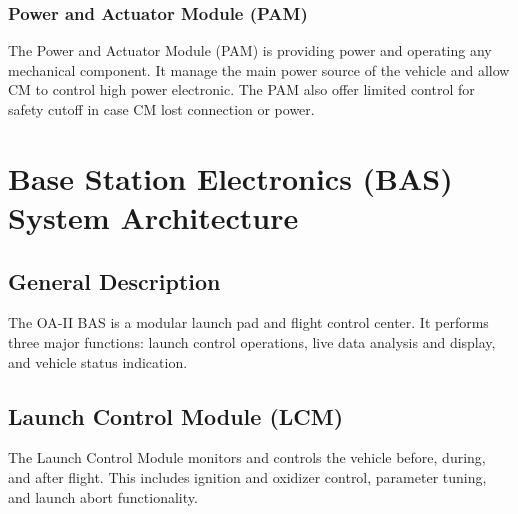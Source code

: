 \documentclass[12pt,article]{memoir}
\begin{document}
\subsection{Power and Actuator Module (PAM)}%
The Power and Actuator Module (PAM) is providing power and operating any mechanical component. It manage the main power source of the vehicle and allow CM to control high power electronic. The PAM also offer limited control for safety cutoff in case CM lost connection or power.

\newpage

\chapter{Base Station Electronics (BAS) System Architecture}
\section{General Description}
The OA-II BAS is a modular launch pad and flight control center. It performs three major functions: launch control operations, live data analysis and display, and vehicle status indication.
\section{Launch Control Module (LCM)}
The Launch Control Module monitors and controls the vehicle before, during, and after flight. This includes ignition and oxidizer control, parameter tuning, and launch abort functionality.
\end{document}
